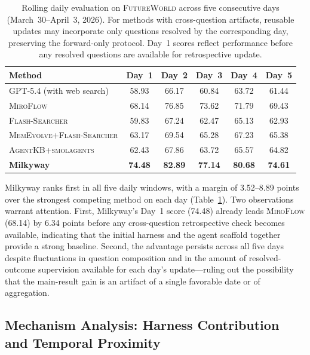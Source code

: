 \begin{table}[t]
\centering
\small
\setlength{\tabcolsep}{4.2pt}
\caption{Rolling daily evaluation on \textsc{FutureWorld} across five consecutive days (March~30--April~3, 2026). For methods with cross-question artifacts, reusable updates may incorporate only questions resolved by the corresponding day, preserving the forward-only protocol. Day~1 scores reflect performance before any resolved questions are available for retrospective update.}
\label{tab:evolution_ourbench}
\begin{tabular}{l ccccc}
\toprule
Method & Day~1 & Day~2 & Day~3 & Day~4 & Day~5 \\
\midrule
GPT-5.4 (with web search)         & 58.93 & 66.17 & 60.84 & 63.72 & 61.44 \\
\textsc{MiroFlow}                 & 68.14 & 76.85 & 73.62 & 71.79 & 69.43 \\
\textsc{Flash-Searcher}           & 59.83 & 67.24 & 62.47 & 65.13 & 62.93 \\
\midrule
\textsc{MemEvolve+Flash-Searcher} & 63.17 & 69.54 & 65.28 & 67.23 & 65.38 \\
\textsc{AgentKB+smolagents}       & 62.43 & 67.86 & 63.72 & 65.57 & 64.82 \\
\midrule
\textbf{Milkyway}                 & \textbf{74.48} & \textbf{82.89} & \textbf{77.14} & \textbf{80.68} & \textbf{74.61} \\
\bottomrule
\end{tabular}
\end{table}

Milkyway ranks first in all five daily windows, with a margin of 3.52--8.89 points over the strongest competing method on each day (Table~\ref{tab:evolution_ourbench}). Two observations warrant attention. First, Milkyway's Day~1 score (74.48) already leads \textsc{MiroFlow} (68.14) by 6.34 points before any cross-question retrospective check becomes available, indicating that the initial harness and the agent scaffold together provide a strong baseline. Second, the advantage persists across all five days despite fluctuations in question composition and in the amount of resolved-outcome supervision available for each day's update---ruling out the possibility that the main-result gain is an artifact of a single favorable date or of aggregation.

\subsection{Mechanism Analysis: Harness Contribution and Temporal Proximity}
\label{sec:temporal_proximity}

